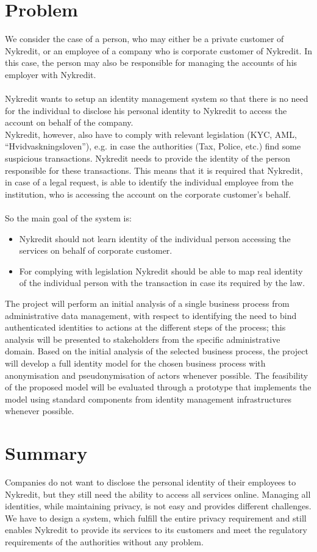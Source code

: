 \section{Problem}
We consider the case of a person, who may either be a private customer of Nykredit, or an employee of a company who is corporate customer of Nykredit. In this case, the person may also be responsible for managing the accounts of his employer with Nykredit.
\\
\\Nykredit wants to setup an identity management system so that there is no need for the individual to disclose his personal identity to Nykredit to access the account on behalf of the company.
\\Nykredit, however, also have to comply with relevant legislation (KYC, AML, “Hvidvaskningsloven”),  e.g. in case the authorities (Tax, Police, etc.) find some suspicious transactions. Nykredit needs to provide the identity of the person responsible for these transactions.
This means that it is required that Nykredit, in case of a legal request, is able to identify the individual employee from the institution, who is accessing the account on the corporate customer’s behalf.
\\
\\So the main goal of the system is:
\begin{itemize}
	\item Nykredit should not learn identity of the individual person accessing the services on behalf of corporate customer.
	\item For complying with legislation Nykredit should be able to map real identity of the individual person with the transaction in case its required by the law.
\end{itemize}
The project will perform an initial analysis of a single business process from administrative data management, with respect to identifying the need to bind authenticated identities to actions at the different steps of the process; this analysis will be presented to stakeholders from the specific administrative domain. Based on the initial analysis of the selected business process, the project will develop a full identity model for the chosen business process with anonymisation and pseudonymisation of actors whenever possible. The feasibility of the proposed model will be evaluated through a prototype that implements the model using standard components from identity management infrastructures whenever possible.
\section{Summary}
Companies do not want to disclose the personal identity of their employees to Nykredit, but they still need the ability to access all services online. Managing all identities, while maintaining privacy, is not easy and provides different challenges. We have to design a system, which fulfill the entire privacy requirement and still enables Nykredit to provide its services to its customers and meet the regulatory requirements of the authorities without any problem.
 